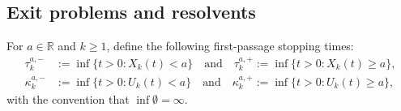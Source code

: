 \documentclass[12pt,reqno]{amsart}
\newcommand{\blue}{\textcolor[rgb]{0.00,0.00,1.00}}
\newcommand{\green}{\textcolor[rgb]{0.00,0.70,.30}}
\theoremstyle{definition}
\newtheorem{defi}[theorem]{Definition}
\theoremstyle{remark}
\begin{document}


\subsection{Exit problems and resolvents}\label{sec:main}


For $ a \in \mathbb{R}$ and $k\geq 1$, define the following first-passage stopping times:
\begin{align*}
\tau_{k}^{a,-} & := \inf\{t>0 \colon X_k(t)<a\} \quad \textrm{and} \quad \tau_{k}^{a,+} := \inf\{t>0 \colon X_k(t)\geq a\},\\
\kappa_k^{a,-} & := \inf\{t>0 \colon U_k(t)<a\} \quad \textrm{and} \quad \kappa_k^{a,+} := \inf\{t>0 \colon U_k(t)\geq a\},
\end{align*}
with the convention that $\inf \emptyset=\infty$.


\end{document}

